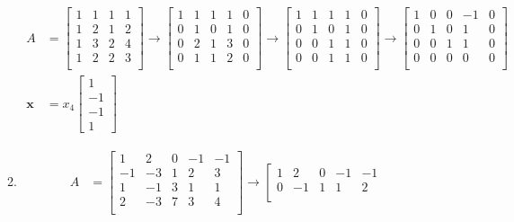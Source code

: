 \documentclass[letterpaper]{article}
\begin{document}
\begin{enumerate}
\begin{enumerate}
  \begin{align*}
    A&=
    \left[\begin{array}{cccc}
      1&1&1&1\\
      1&2&1&2\\
      1&3&2&4\\
      1&2&2&3\\
    \end{array}\right]
    \to
    \left[\begin{array}{cccc|c}
      1&1&1&1&0\\
      0&1&0&1&0\\
      0&2&1&3&0\\
      0&1&1&2&0\\
    \end{array}\right]
    \to
    \left[\begin{array}{cccc|c}
      1&1&1&1&0\\
      0&1&0&1&0\\
      0&0&1&1&0\\
      0&0&1&1&0\\
    \end{array}\right]
    \to
    \left[\begin{array}{cccc|c}
      1&0&0&-1&0\\
      0&1&0&1&0\\
      0&0&1&1&0\\
      0&0&0&0&0\\
    \end{array}\right]
    \\
    \mathbf{x}&=x_4\left[\begin{array}{c}1\\-1\\-1\\1\end{array}\right]
  \end{align*}
  \setcounter{enumii}{5}
  \item
  \begin{align*}
    A&=
    \left[\begin{array}{ccccc}
      1&2&0&-1&-1\\
      -1&-3&1&2&3\\
      1&-1&3&1&1\\
      2&-3&7&3&4\\
    \end{array}\right]
    \to
    \left[\begin{array}{ccccc}
       1& 2& 0&-1&-1\\
       0&-1& 1& 1& 2\\

\end{array}
\end{align*}
\end{enumerate}
\end{enumerate}
\end{document}
